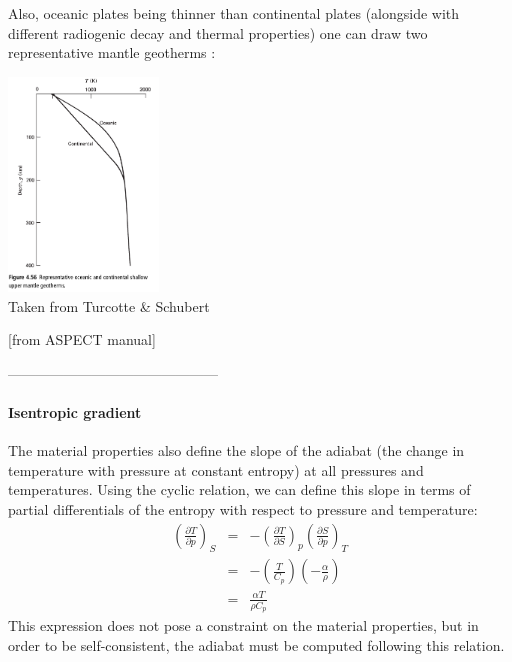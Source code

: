 Also, oceanic plates being thinner than continental plates (alongside with different 
radiogenic decay and thermal properties) one can draw two representative mantle 
geotherms \cite{tusc}:

\begin{center}
\includegraphics[width=4cm]{images/adiabatic/tusc.png}\\
{\captionfont Taken from Turcotte \& Schubert \cite{tusc}}
\end{center}




\newpage



[from ASPECT manual]



---------------------------------------------
\paragraph{Isentropic gradient}

The material properties also define the slope of the adiabat (the change in temperature with
pressure at constant entropy) at all pressures and temperatures. Using the cyclic relation,
we can define this slope in terms of partial differentials of the entropy with respect to pressure
and temperature:
\begin{eqnarray}
\left( \frac{\partial T}{\partial p} \right)_{S} 
&=& - \left( \frac{\partial T}{\partial S} \right)_{p} \left( \frac{\partial S}{\partial p} \right)_{T} \\
&=& - \left( \frac{T}{C_p} \right) \left( - \frac{\alpha}{\rho} \right) \\
&=& \frac{\alpha T}{\rho C_p} \label{eq:mm_isentropic_gradient}
\end{eqnarray}
This expression does not pose a constraint on the material properties, but in order to be 
self-consistent, the adiabat must be computed following this relation.

